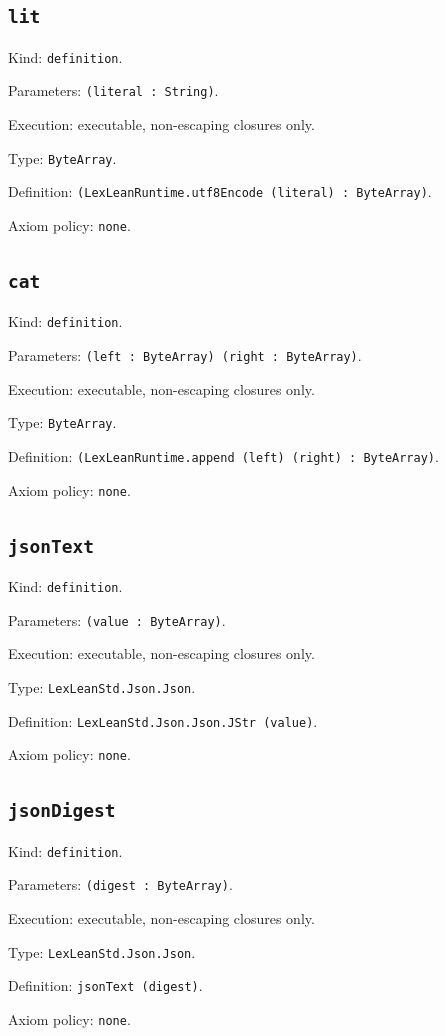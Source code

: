 \documentclass[11pt]{article}
\begin{document}
\subsection*{\texttt{lit}}
\noindent Kind: \texttt{definition}.\par
\noindent Parameters: \texttt{(literal : String)}.\par
\noindent Execution: executable, non-escaping closures only.\par
\noindent Type: \texttt{ByteArray}.\par
\noindent Definition: \texttt{(LexLeanRuntime.utf8Encode (literal) : ByteArray)}.\par
\noindent Axiom policy: \texttt{none}.\par
\subsection*{\texttt{cat}}
\noindent Kind: \texttt{definition}.\par
\noindent Parameters: \texttt{(left : ByteArray) (right : ByteArray)}.\par
\noindent Execution: executable, non-escaping closures only.\par
\noindent Type: \texttt{ByteArray}.\par
\noindent Definition: \texttt{(LexLeanRuntime.append (left) (right) : ByteArray)}.\par
\noindent Axiom policy: \texttt{none}.\par
\subsection*{\texttt{jsonText}}
\noindent Kind: \texttt{definition}.\par
\noindent Parameters: \texttt{(value : ByteArray)}.\par
\noindent Execution: executable, non-escaping closures only.\par
\noindent Type: \texttt{LexLeanStd.Json.Json}.\par
\noindent Definition: \texttt{LexLeanStd.Json.Json.JStr (value)}.\par
\noindent Axiom policy: \texttt{none}.\par
\subsection*{\texttt{jsonDigest}}
\noindent Kind: \texttt{definition}.\par
\noindent Parameters: \texttt{(digest : ByteArray)}.\par
\noindent Execution: executable, non-escaping closures only.\par
\noindent Type: \texttt{LexLeanStd.Json.Json}.\par
\noindent Definition: \texttt{jsonText (digest)}.\par
\noindent Axiom policy: \texttt{none}.\par
\end{document}
